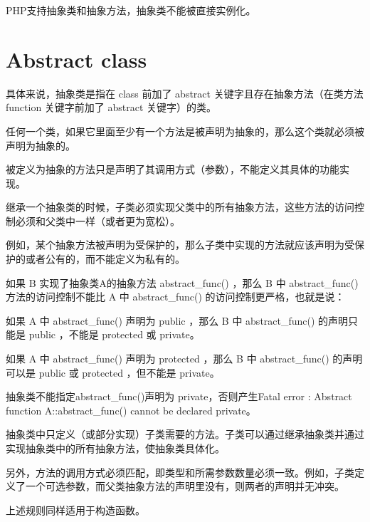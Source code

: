PHP支持抽象类和抽象方法，抽象类不能被直接实例化。


\section{Abstract class}

具体来说，抽象类是指在 class 前加了 abstract 关键字且存在抽象方法（在类方法 function 关键字前加了 abstract 关键字）的类。



\begin{compactitem}
\item 任何一个类，如果它里面至少有一个方法是被声明为抽象的，那么这个类就必须被声明为抽象的。
\item 被定义为抽象的方法只是声明了其调用方式（参数），不能定义其具体的功能实现。
\item 继承一个抽象类的时候，子类必须实现父类中的所有抽象方法，这些方法的访问控制必须和父类中一样（或者更为宽松）。
\end{compactitem}

例如，某个抽象方法被声明为受保护的，那么子类中实现的方法就应该声明为受保护的或者公有的，而不能定义为私有的。

如果 B 实现了抽象类A的抽象方法 abstract\_func() ，那么 B 中 abstract\_func() 方法的访问控制不能比 A 中 abstract\_func() 的访问控制更严格，也就是说：

\begin{compactenum}
\item 如果 A 中 abstract\_func() 声明为 public ，那么 B 中 abstract\_func() 的声明只能是 public ，不能是 protected 或 private。
\item 如果 A 中 abstract\_func() 声明为 protected ，那么 B 中 abstract\_func() 的声明可以是 public 或 protected ，但不能是 private。
\item 抽象类不能指定abstract\_func()声明为 private，否则产生Fatal error : Abstract function A::abstract\_func() cannot be declared private。
\end{compactenum}



抽象类中只定义（或部分实现）子类需要的方法。子类可以通过继承抽象类并通过实现抽象类中的所有抽象方法，使抽象类具体化。

另外，方法的调用方式必须匹配，即类型和所需参数数量必须一致。例如，子类定义了一个可选参数，而父类抽象方法的声明里没有，则两者的声明并无冲突。 

上述规则同样适用于构造函数。

